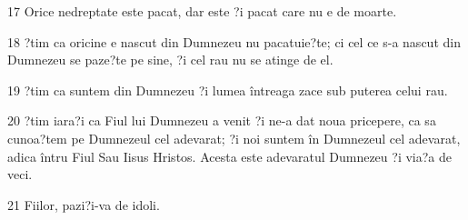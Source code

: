 \par 17 Orice nedreptate este pacat, dar este ?i pacat care nu e de moarte.
\par 18 ?tim ca oricine e nascut din Dumnezeu nu pacatuie?te; ci cel ce s-a nascut din Dumnezeu se paze?te pe sine, ?i cel rau nu se atinge de el.
\par 19 ?tim ca suntem din Dumnezeu ?i lumea întreaga zace sub puterea celui rau.
\par 20 ?tim iara?i ca Fiul lui Dumnezeu a venit ?i ne-a dat noua pricepere, ca sa cunoa?tem pe Dumnezeul cel adevarat; ?i noi suntem în Dumnezeul cel adevarat, adica întru Fiul Sau Iisus Hristos. Acesta este adevaratul Dumnezeu ?i via?a de veci.
\par 21 Fiilor, pazi?i-va de idoli.


